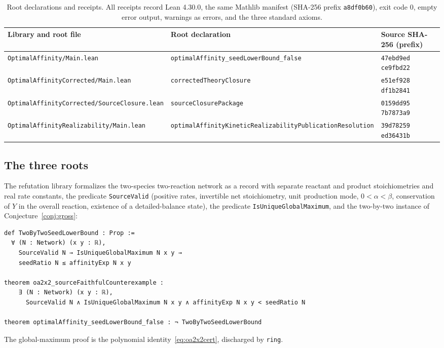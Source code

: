 \documentclass[11pt,reqno]{amsart}
\theoremstyle{plain}
\theoremstyle{definition}
\theoremstyle{remark}
\numberwithin{equation}{section}
\begin{document}
\begin{table}[H]
\centering\small
\begin{tabular}{@{}>{\raggedright\arraybackslash}p{}>{\raggedright\arraybackslash}p{}l@{}}
\toprule
Library and root file & Root declaration & Source SHA-256 (prefix) \\
\midrule
\texttt{OptimalAffinity/\allowbreak Main.lean} & \texttt{optimalAffinity\_\allowbreak \allowbreak seedLowerBound\_\allowbreak false} & \texttt{47ebd9ed ce9fbd22} \\
\texttt{OptimalAffinityCorrected/\allowbreak Main.lean} & \texttt{correctedTheoryClosure} & \texttt{e51ef928 df1b2841} \\
\texttt{OptimalAffinityCorrected/\allowbreak SourceClosure.lean} & \texttt{sourceClosurePackage} & \texttt{0159dd95 7b7873a9} \\
\texttt{OptimalAffinityRealizability/\allowbreak Main.lean} & \texttt{optimalAffinityKinetic\allowbreak Realizability\allowbreak PublicationResolution} & \texttt{39d78259 ed36431b} \\
\bottomrule
\end{tabular}
\caption{Root declarations and receipts.  All receipts record Lean 4.30.0, the same Mathlib manifest (SHA-256 prefix \texttt{a8df0b60}), exit code $0$, empty error output, warnings as errors, and the three standard axioms.}
\label{tab:receipts}
\end{table}

\subsection{The three roots}
The refutation library formalizes the two-species two-reaction network as a record with separate reactant and product stoichiometries and real rate constants, the predicate \texttt{SourceValid} (positive rates, invertible net stoichiometry, unit production mode, $0<\alpha<\beta$, conservation of $Y$ in the overall reaction, existence of a detailed-balance state), the predicate \texttt{IsUniqueGlobalMaximum}, and the two-by-two instance of Conjecture~\ref{conj:gross}:
\begin{lstlisting}
def TwoByTwoSeedLowerBound : Prop :=
  ∀ (N : Network) (x y : ℝ),
    SourceValid N → IsUniqueGlobalMaximum N x y →
    seedRatio N ≤ affinityExp N x y

theorem oa2x2_sourceFaithfulCounterexample :
    ∃ (N : Network) (x y : ℝ),
      SourceValid N ∧ IsUniqueGlobalMaximum N x y ∧ affinityExp N x y < seedRatio N

theorem optimalAffinity_seedLowerBound_false : ¬ TwoByTwoSeedLowerBound
\end{lstlisting}
The global-maximum proof is the polynomial identity~\eqref{eq:oa2x2cert}, discharged by \texttt{ring}.
\end{document}
